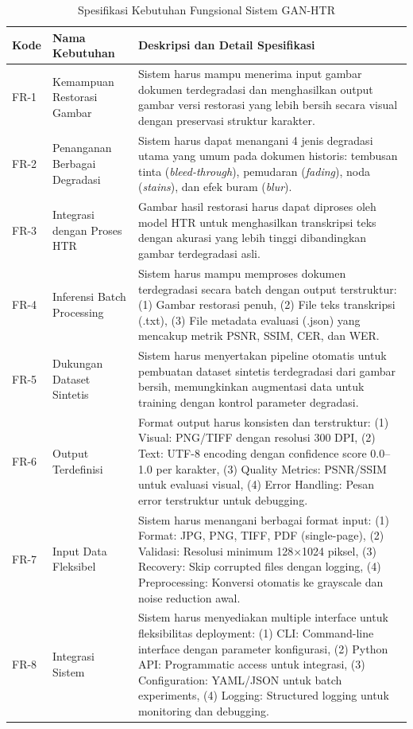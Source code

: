 \documentclass[12pt,a4paper]{article}
\begin{document}
\begin{table}[htbp!]
\centering
\small
\caption{Spesifikasi Kebutuhan Fungsional Sistem GAN-HTR}
\label{tab:functional_requirements}
\begin{tabular}{p{}p{}p{}}
\toprule
\textbf{Kode} & \textbf{Nama Kebutuhan} & \textbf{Deskripsi dan Detail Spesifikasi} \\
\midrule
FR-1 & Kemampuan Restorasi Gambar & Sistem harus mampu menerima input gambar dokumen terdegradasi dan menghasilkan output gambar versi restorasi yang lebih bersih secara visual dengan preservasi struktur karakter. \\
\midrule
FR-2 & Penanganan Berbagai Degradasi & Sistem harus dapat menangani 4 jenis degradasi utama yang umum pada dokumen historis: tembusan tinta (\textit{bleed-through}), pemudaran (\textit{fading}), noda (\textit{stains}), dan efek buram (\textit{blur}). \\
\midrule
FR-3 & Integrasi dengan Proses HTR & Gambar hasil restorasi harus dapat diproses oleh model HTR untuk menghasilkan transkripsi teks dengan akurasi yang lebih tinggi dibandingkan gambar terdegradasi asli. \\
\midrule
FR-4 & Inferensi Batch Processing & Sistem harus mampu memproses dokumen terdegradasi secara batch dengan output terstruktur: (1) Gambar restorasi penuh, (2) File teks transkripsi (.txt), (3) File metadata evaluasi (.json) yang mencakup metrik PSNR, SSIM, CER, dan WER. \\
\midrule
FR-5 & Dukungan Dataset Sintetis & Sistem harus menyertakan pipeline otomatis untuk pembuatan dataset sintetis terdegradasi dari gambar bersih, memungkinkan augmentasi data untuk training dengan kontrol parameter degradasi. \\
\midrule
FR-6 & Output Terdefinisi & Format output harus konsisten dan terstruktur: (1) Visual: PNG/TIFF dengan resolusi 300 DPI, (2) Text: UTF-8 encoding dengan confidence score 0.0--1.0 per karakter, (3) Quality Metrics: PSNR/SSIM untuk evaluasi visual, (4) Error Handling: Pesan error terstruktur untuk debugging. \\
\midrule
FR-7 & Input Data Fleksibel & Sistem harus menangani berbagai format input: (1) Format: JPG, PNG, TIFF, PDF (single-page), (2) Validasi: Resolusi minimum 128×1024 piksel, (3) Recovery: Skip corrupted files dengan logging, (4) Preprocessing: Konversi otomatis ke grayscale dan noise reduction awal. \\
\midrule
FR-8 & Integrasi Sistem & Sistem harus menyediakan multiple interface untuk fleksibilitas deployment: (1) CLI: Command-line interface dengan parameter konfigurasi, (2) Python API: Programmatic access untuk integrasi, (3) Configuration: YAML/JSON untuk batch experiments, (4) Logging: Structured logging untuk monitoring dan debugging. \\
\bottomrule
\end{tabular}
\end{table}
\end{document}
